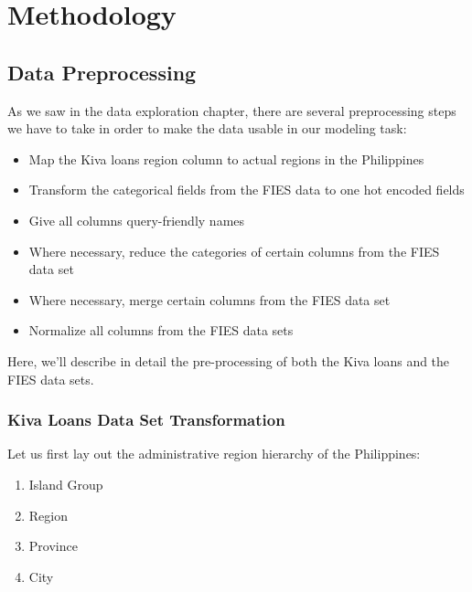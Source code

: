\documentclass{article}
\begin{document}
\section{Methodology}
\hypertarget{data_prep}{\subsection{Data Preprocessing}}
As we saw in the data exploration chapter, there are several preprocessing steps we have to take in order to make the data usable in our modeling task:
\begin{itemize}
  \item Map the Kiva loans region column to actual regions in the Philippines
  \item Transform the categorical fields from the FIES data to one hot encoded fields
  \item Give all columns query-friendly names
  \item Where necessary, reduce the categories of certain columns from the FIES data set
  \item Where necessary, merge certain columns from the FIES data set
  \item Normalize all columns from the FIES data sets
\end{itemize}
Here, we’ll describe in detail the pre-processing of both the Kiva loans and the FIES data sets.

\subsubsection{Kiva Loans Data Set Transformation}
Let us first lay out the administrative region hierarchy of the Philippines:

\begin{enumerate}
  \item Island Group
  \item Region
  \item Province
  \item City
\end{enumerate}
\end{document}
